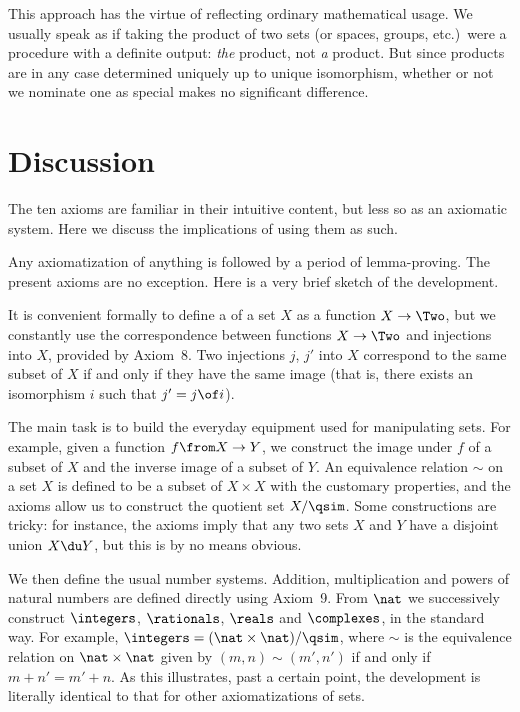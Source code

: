 \documentclass[12pt]{article}
\begin{document}
This approach has the virtue of reflecting ordinary mathematical usage.  We
usually speak as if taking the product of two sets (or spaces, groups,
etc.)\ were a procedure with a definite output: \emph{the} product, not
\emph{a} product.  But since products are in any case determined uniquely
up to unique isomorphism, whether or not we nominate one as special makes
no significant difference.



\section{Discussion} 
\label{sec:rmks}


The ten axioms are familiar in their intuitive content, but less so
as an axiomatic system.  Here we discuss the implications of using them as
such. 


Any axiomatization of anything is followed by a period of lemma-proving.
The present axioms are no exception.  Here is a very brief sketch of the
development.

It is convenient formally to define a  of a set $X$ as a
function $X \to \Two$, but we constantly use the correspondence between
functions $X \to \Two$ and injections into $X$, provided by Axiom~8.  Two
injections $j$, $j'$ into $X$ correspond to the same subset of $X$ if and
only if they have the same image (that is, there exists an isomorphism $i$
such that $j' = j \of i$).

The main task is to build the everyday equipment used for manipulating
sets.  For example, given a function $f\from X \to Y$, we construct the
image under $f$ of a subset of $X$ and the inverse image of a subset of
$Y$.  An equivalence relation $\sim$ on a set $X$ is defined to be a subset
of $X \times X$ with the customary properties, and the axioms allow us to
construct the quotient set $X/\qsim$.  Some constructions are tricky: for
instance, the axioms imply that any two sets $X$ and $Y$ have a disjoint
union $X \du Y$, but this is by no means obvious.

We then define the usual number systems.  Addition, multiplication and
powers of natural numbers are defined directly using Axiom~9.  From $\nat$
we successively construct $\integers$, $\rationals$, $\reals$ and
$\complexes$, in the standard way.  For example, $\integers = (\nat \times
\nat)/\qsim$, where $\sim$ is the equivalence relation on $\nat \times
\nat$ given by $(m, n) \sim (m', n')$ if and only if $m + n' = m' + n$.  As
this illustrates, past a certain point, the development is literally
identical to that for other axiomatizations of sets.
\end{document}
